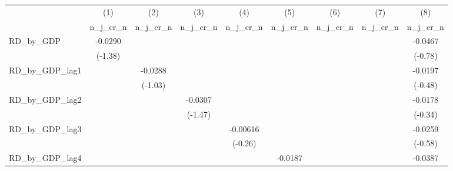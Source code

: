{
\def\sym#1{\ifmmode^{#1}\else\(^{#1}\)\fi}
\begin{tabular}{l*{8}{c}}
\toprule
          &\multicolumn{1}{c}{(1)}&\multicolumn{1}{c}{(2)}&\multicolumn{1}{c}{(3)}&\multicolumn{1}{c}{(4)}&\multicolumn{1}{c}{(5)}&\multicolumn{1}{c}{(6)}&\multicolumn{1}{c}{(7)}&\multicolumn{1}{c}{(8)}\\
          &\multicolumn{1}{c}{n\_j\_cr\_n}&\multicolumn{1}{c}{n\_j\_cr\_n}&\multicolumn{1}{c}{n\_j\_cr\_n}&\multicolumn{1}{c}{n\_j\_cr\_n}&\multicolumn{1}{c}{n\_j\_cr\_n}&\multicolumn{1}{c}{n\_j\_cr\_n}&\multicolumn{1}{c}{n\_j\_cr\_n}&\multicolumn{1}{c}{n\_j\_cr\_n}\\
\midrule
RD\_by\_GDP &  -0.0290         &                  &                  &                  &                  &                  &                  &  -0.0467         \\
          &  (-1.38)         &                  &                  &                  &                  &                  &                  &  (-0.78)         \\
\addlinespace
RD\_by\_GDP\_lag1&                  &  -0.0288         &                  &                  &                  &                  &                  &  -0.0197         \\
          &                  &  (-1.03)         &                  &                  &                  &                  &                  &  (-0.48)         \\
\addlinespace
RD\_by\_GDP\_lag2&                  &                  &  -0.0307         &                  &                  &                  &                  &  -0.0178         \\
          &                  &                  &  (-1.47)         &                  &                  &                  &                  &  (-0.34)         \\
\addlinespace
RD\_by\_GDP\_lag3&                  &                  &                  & -0.00616         &                  &                  &                  &  -0.0259         \\
          &                  &                  &                  &  (-0.26)         &                  &                  &                  &  (-0.58)         \\
\addlinespace
RD\_by\_GDP\_lag4&                  &                  &                  &                  &  -0.0187         &                  &                  &  -0.0387         \\

\end{tabular}}
